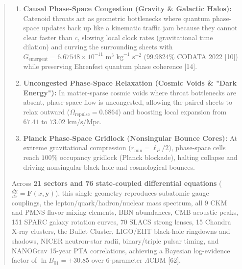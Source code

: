 \documentclass[10pt,a4paper]{article}
\begin{document}
\begin{abstract}
\begin{enumerate}
\item \textbf{Causal Phase-Space Congestion (Gravity \& Galactic Halos):} Catenoid throats act as geometric bottlenecks where quantum phase-space updates back up like a kinematic traffic jam because they cannot clear faster than $c$, slowing local clock rates (gravitational time dilation) and curving the surrounding sheets with $G_{\text{emergent}} = 6.67548 \times 10^{-11}\text{ m}^3\text{ kg}^{-1}\text{ s}^{-2}$ ($99.9824\%$ CODATA 2022 [10]) while preserving Ehrenfest quantum phase coherence [14].
\item \textbf{Uncongested Phase-Space Relaxation (Cosmic Voids \& "Dark Energy"):} In matter-sparse cosmic voids where throat bottlenecks are absent, phase-space flow is uncongested, allowing the paired sheets to relax outward ($\Omega_{\text{repulse}} = 0.6864$) and boosting local expansion from $67.41$ to $73.02\text{ km/s/Mpc}$.
\item \textbf{Planck Phase-Space Gridlock (Nonsingular Bounce Cores):} At extreme gravitational compression ($r_{\min} = \ell_P/2$), phase-space cells reach $100\%$ occupancy gridlock (Planck blockade), halting collapse and driving nonsingular black-hole and cosmological bounces.
\end{enumerate}
Across \textbf{21 sectors and 76 state-coupled differential equations} ($\frac{d\mathbf{y}}{dx} = \mathbf{F}(x,\mathbf{y})$), this single geometry reproduces subatomic gauge couplings, the lepton/quark/hadron/nuclear mass spectrum, all 9 CKM and PMNS flavor-mixing elements, BBN abundances, CMB acoustic peaks, 151 SPARC galaxy rotation curves, 70 SLACS strong lenses, 15 Chandra X-ray clusters, the Bullet Cluster, LIGO/EHT black-hole ringdowns and shadows, NICER neutron-star radii, binary/triple pulsar timing, and NANOGrav 15-year PTA correlations, achieving a Bayesian log-evidence factor of $\ln B_{01} = +30.85$ over 6-parameter $\Lambda\text{CDM}$ [62].

\end{abstract}
\end{document}
